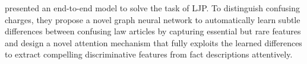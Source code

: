 \documentclass[sn-mathphys,Numbered]{sn-jnl}%
\theoremstyle{thmstyleone}%
\theoremstyle{thmstyletwo}%
\theoremstyle{thmstylethree}%
\begin{document}
\citet{xu2020distinguish} presented an end-to-end model to solve the task of LJP. To distinguish confusing charges, they propose a novel graph neural network to automatically learn subtle differences between confusing law articles by capturing essential but rare features and design a novel attention mechanism that fully exploits the learned differences to extract compelling discriminative features from fact descriptions attentively.%
\end{document}
